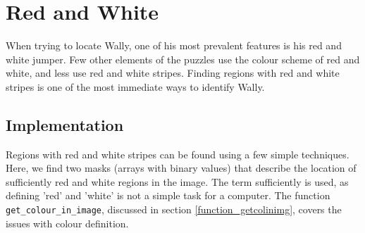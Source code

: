 \documentclass[../main.tex]{subfiles}
\begin{document}
\section{Red and White}
  When trying to locate Wally, one of his most prevalent features is his red and white jumper.
  Few other elements of the puzzles use the colour scheme of red and white, and less use red and white stripes.
  Finding regions with red and white stripes is one of the most immediate ways to identify Wally.

  \subsection{Implementation}
    Regions with red and white stripes can be found using a few simple techniques.
    Here, we find two masks (arrays with binary values) that describe the location of sufficiently red and white regions in the image.
    The term sufficiently is used, as defining 'red' and 'white' is not a simple task for a computer.
    The function \texttt{get\_colour\_in\_image}, discussed in section \ref{function_getcolinimg}, covers the issues with colour definition.
\end{document}
